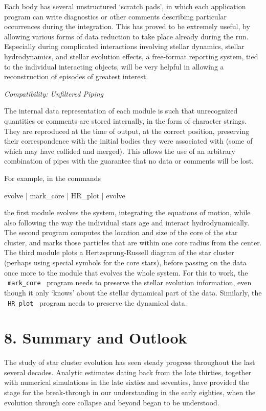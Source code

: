 Each body has several unstructured `scratch pads', in which each
application program can write diagnostics or other comments describing
particular occurrences during the integration.  This has proved to be
extremely useful, by allowing various forms of data reduction to take
place already during the run.  Especially during complicated
interactions involving stellar dynamics, stellar hydrodynamics, and
stellar evolution effects, a free-format reporting system, tied to the
individual interacting objects, will be very helpful in allowing a
reconstruction of episodes of greatest interest.

\bigskip
\noindent
{\it Compatibility: Unfiltered Piping}
\medskip

The internal data representation of each module is such that
unrecognized quantities or comments are stored internally, in the form
of character strings.  They are reproduced at the time of output, at
the correct position, preserving their correspondence with the initial
bodies they were associated with (some of which may have collided and
merged).  This allows the use of an arbitrary combination of pipes with
the guarantee that no data or comments will be lost.

For example, in the commands

{\codes
evolve | mark\_core | HR\_plot | evolve
}
\medskip

the first module evolves the system, integrating the equations of
motion, while also following the way the individual stars age and
interact hydrodynamically.  The second program computes the location
and size of the core of the star cluster, and marks those particles
that are within one core radius from the center.  The third module
plots a Hertzsprung-Russell diagram of the star cluster (perhaps using
special symbols for the core stars), before passing on the data once
more to the module that evolves the whole system.  For this to work,
the {\tt \ mark\_core\ } program needs to preserve the stellar
evolution information, even though it only `knows' about the stellar
dynamical part of the data.  Similarly, the {\tt \ HR\_plot\ } program
needs to preserve the dynamical data.

\section{8. Summary and Outlook}

The study of star cluster evolution has seen steady progress
throughout the last several decades.  Analytic estimates dating back
from the late thirties, together with numerical simulations in the
late sixties and seventies, have provided the stage for the
break-through in our understanding in the early eighties, when the
evolution through core collapse and beyond began to be understood.

